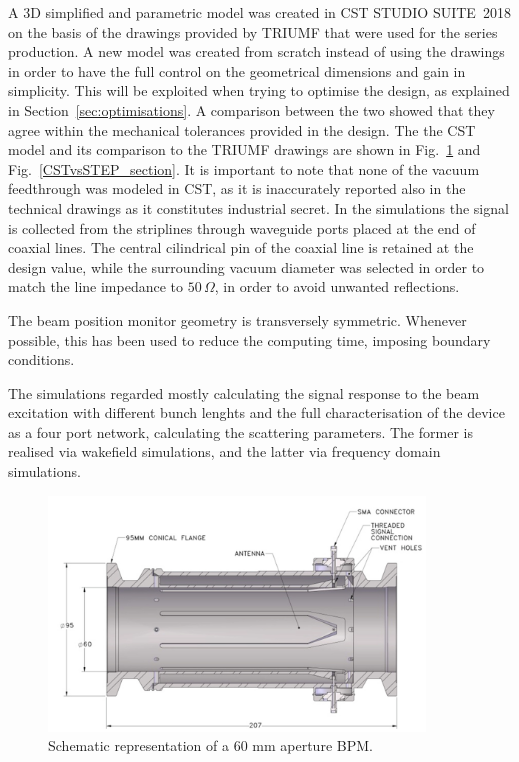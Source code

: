 A 3D simplified and parametric model was created in CST STUDIO SUITE\textregistered~2018 on the basis of the drawings provided by TRIUMF that were used for the series production. A new model was created from scratch instead of using the drawings in order to have the full control on the geometrical dimensions and gain in simplicity. This will be exploited when trying to optimise the design, as explained in Section~\ref{sec:optimisations}. A comparison between the two showed that they agree within the mechanical tolerances provided in the design. The the CST model and its comparison to the TRIUMF drawings are shown in Fig.~\ref{STEP_tipp} and Fig.~\ref{CSTvsSTEP_section}. It is important to note that none of the vacuum feedthrough was modeled in CST, as it is inaccurately reported also in the technical drawings as it constitutes industrial secret. In the simulations the signal is collected from the striplines through waveguide ports placed at the end of coaxial lines. The central cilindrical pin of the coaxial line is retained at the design value, while the surrounding vacuum diameter was selected in order to match the line impedance to $50\,\Omega$, in order to avoid unwanted reflections.

The beam position monitor geometry is transversely symmetric. Whenever possible, this has been used to reduce the computing time, imposing boundary conditions.

The simulations regarded mostly calculating the signal response to the beam excitation with different bunch lenghts and the full characterisation of the device as a four port network, calculating the scattering parameters. The former is realised via wakefield simulations, and the latter via frequency domain simulations.

\begin{figure}[ht]
\centering
\includegraphics[width=10cm,keepaspectratio]{pictures/tipp_paper}
\caption{Schematic representation of a 60 mm aperture BPM\cite{Shengli:tipp}.}
\label{STEP_tipp}
\end{figure}

